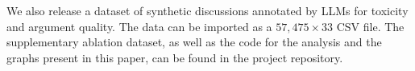 %

We also release \vmd a dataset of synthetic discussions annotated by \acp{LLM} for toxicity and argument quality. The data can be imported as a $57,475 \times 33$ CSV file\datasetlink. The supplementary ablation dataset, as well as the code for the analysis and the graphs present in this paper, can be found in the project repository\analysislink.